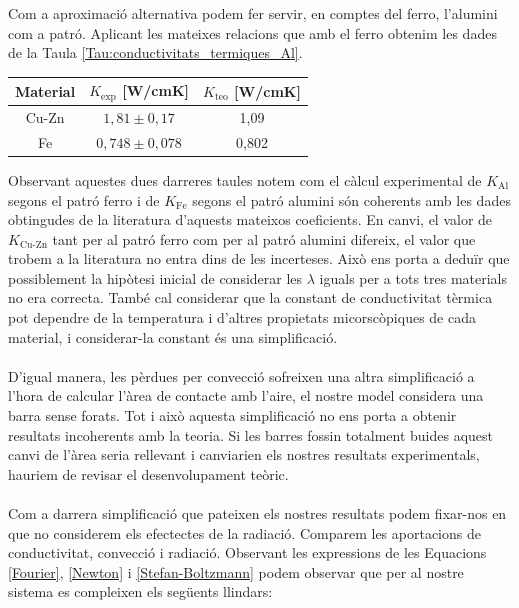 \documentclass[12pt,twosides,onecolumn,openany]{article}
\newenvironment{Figura}
  {\par\medskip\noindent\minipage{\linewidth}}
  {\endminipage\par\medskip}
\begin{document}
\begin{multicols}{2}
\begin{Figura}
  \label{Tau:conductivitats_termiques_Fe}
\end{Figura}
Com a aproximació alternativa podem fer servir, en comptes del ferro, l'alumini com a patró. Aplicant les mateixes relacions que amb el ferro obtenim les dades de la Taula \ref{Tau:conductivitats_termiques_Al}.
\begin{Figura}
  \centering
  \begin{tabular}{c|c|c}
    Material & $K_{\text{exp}}$ [W/cmK] & $K_{\text{teo}}$ [W/cmK]\\
    \hline\hline
    Cu-Zn & $1,81\pm0,17$ & 1,09\\
    Fe & $0,748\pm0,078$ & 0,802
  \end{tabular}
  \label{Tau:conductivitats_termiques_Al}
\end{Figura}
Observant aquestes dues darreres taules notem com el càlcul experimental de $K_{\text{Al}}$ segons el patró ferro i de $K_{\text{Fe}}$ segons el patró alumini són coherents amb les dades obtingudes de la literatura d'aquests mateixos coeficients. En canvi, el valor de $K_{\text{Cu-Zn}}$ tant per al patró ferro com per al patró alumini difereix, el valor que trobem a la literatura no entra dins de les incerteses. Això ens porta a deduïr que possiblement la hipòtesi inicial de considerar les $\lambda$ iguals per a tots tres materials no era correcta. També cal considerar que la constant de conductivitat tèrmica pot dependre de la temperatura i d'altres propietats micorscòpiques de cada material, i considerar-la constant és una simplificació.\\\\
D'igual manera, les pèrdues per convecció sofreixen una altra simplificació a l'hora de calcular l'àrea de contacte amb l'aire, el nostre model considera una barra sense forats. Tot i això aquesta simplificació no ens porta a obtenir resultats incoherents amb la teoria. Si les barres fossin totalment buides aquest canvi de l'àrea seria rellevant i canviarien els nostres resultats experimentals, hauriem de revisar el desenvolupament teòric.\\\\
Com a darrera simplificació que pateixen els nostres resultats podem fixar-nos en que no considerem els efectectes de la radiació. Comparem les aportacions de conductivitat, convecció i radiació. Observant les expressions de les Equacions \eqref{Fourier}, \eqref{Newton} i \eqref{Stefan-Boltzmann} podem observar que per al nostre sistema es compleixen els següents llindars:

\end{multicols}
\end{document}
